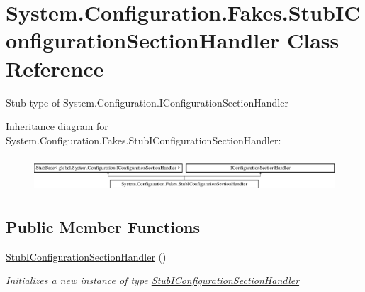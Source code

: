 \hypertarget{class_system_1_1_configuration_1_1_fakes_1_1_stub_i_configuration_section_handler}{\section{System.\-Configuration.\-Fakes.\-Stub\-I\-Configuration\-Section\-Handler Class Reference}
\label{class_system_1_1_configuration_1_1_fakes_1_1_stub_i_configuration_section_handler}
}


Stub type of System.\-Configuration.\-I\-Configuration\-Section\-Handler 


Inheritance diagram for System.\-Configuration.\-Fakes.\-Stub\-I\-Configuration\-Section\-Handler\-:\begin{figure}[H]
\begin{center}
\leavevmode
\includegraphics[height=1.317647cm]{class_system_1_1_configuration_1_1_fakes_1_1_stub_i_configuration_section_handler}
\end{center}
\end{figure}
\subsection*{Public Member Functions}
\begin{DoxyCompactItemize}
\item 
\hyperlink{class_system_1_1_configuration_1_1_fakes_1_1_stub_i_configuration_section_handler_ad21f2b0bc71ff67c0456b6bbed78c94d}{Stub\-I\-Configuration\-Section\-Handler} ()
\begin{DoxyCompactList}\small\item\em Initializes a new instance of type \hyperlink{class_system_1_1_configuration_1_1_fakes_1_1_stub_i_configuration_section_handler}{Stub\-I\-Configuration\-Section\-Handler}\end{DoxyCompactList}\end{DoxyCompactItemize}
